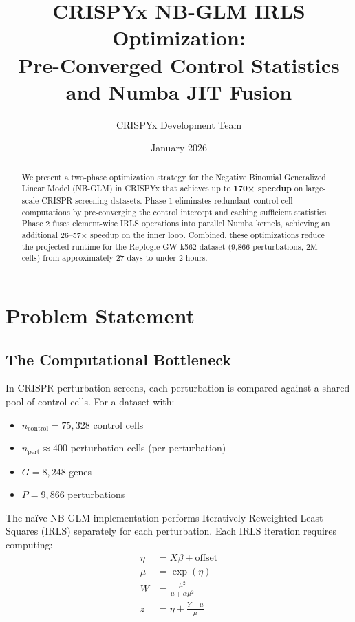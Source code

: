 \documentclass{article}
\title{CRISPYx NB-GLM IRLS Optimization:\\Pre-Converged Control Statistics and Numba JIT Fusion}
\author{CRISPYx Development Team}
\date{January 2026}
\begin{document}
\maketitle

\begin{abstract}
We present a two-phase optimization strategy for the Negative Binomial Generalized Linear Model (NB-GLM) in CRISPYx that achieves up to \textbf{170× speedup} on large-scale CRISPR screening datasets. Phase 1 eliminates redundant control cell computations by pre-converging the control intercept and caching sufficient statistics. Phase 2 fuses element-wise IRLS operations into parallel Numba kernels, achieving an additional 26--57× speedup on the inner loop. Combined, these optimizations reduce the projected runtime for the Replogle-GW-k562 dataset (9,866 perturbations, 2M cells) from approximately 27 days to under 2 hours.
\end{abstract}

\section{Problem Statement}

\subsection{The Computational Bottleneck}

In CRISPR perturbation screens, each perturbation is compared against a shared pool of control cells. For a dataset with:
\begin{itemize}
    \item $n_{\text{control}} = 75{,}328$ control cells
    \item $n_{\text{pert}} \approx 400$ perturbation cells (per perturbation)
    \item $G = 8{,}248$ genes
    \item $P = 9{,}866$ perturbations
\end{itemize}

The na\"ive NB-GLM implementation performs Iteratively Reweighted Least Squares (IRLS) separately for each perturbation. Each IRLS iteration requires computing:
\begin{align}
    \eta &= X\beta + \text{offset} \label{eq:eta}\\
    \mu &= \exp(\eta) \label{eq:mu}\\
    W &= \frac{\mu^2}{\mu + \alpha\mu^2} \label{eq:weights}\\
    z &= \eta + \frac{Y - \mu}{\mu} \label{eq:working_response}
\end{align}
\end{document}

